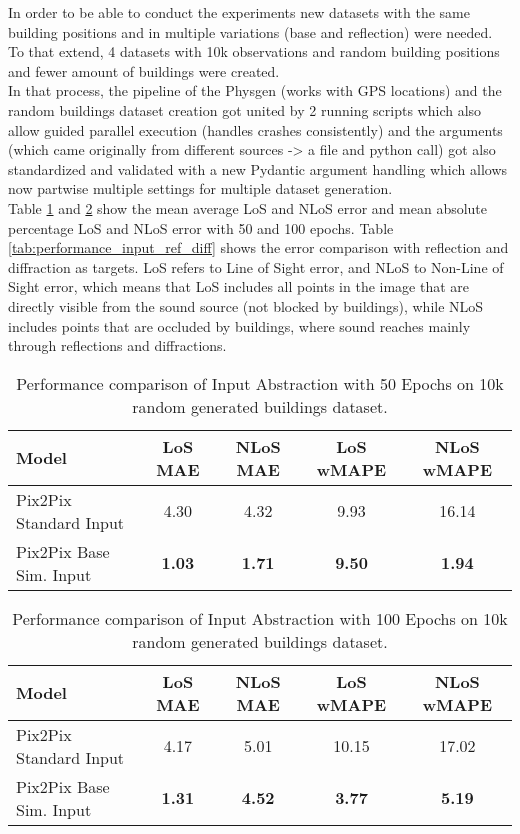 		In order to be able to conduct the experiments new datasets with the same building positions and in multiple variations (base and reflection) were needed. \\
		To that extend, 4 datasets with 10k observations and random building positions and fewer amount of buildings were created.\\
		In that process, the pipeline of the Physgen (works with GPS locations) and the random buildings dataset creation got united by 2 running scripts which also allow guided parallel execution (handles crashes consistently) and the arguments (which came originally from different sources -> a file and python call) got also standardized and validated with a new Pydantic \cite{pydantic} argument handling which allows now partwise multiple settings for multiple dataset generation.\\
		Table \ref{tab:performance_input_50} and \ref{tab:performance_input_100} show the mean average LoS and NLoS error and mean absolute percentage LoS and NLoS error with 50 and 100 epochs. Table \ref{tab:performance_input_ref_diff} shows the error comparison with reflection and diffraction as targets. LoS refers to Line of Sight error, and NLoS to Non-Line of Sight error, which means that LoS includes all points in the image that are directly visible from the sound source (not blocked by buildings), while NLoS includes points that are occluded by buildings, where sound reaches mainly through reflections and diffractions.
		
		\begin{table}[h!]
			\centering
			\begin{tabular}{|l|c|c|c|c|}
				\hline
				\textbf{Model} & \textbf{LoS MAE} & \textbf{NLoS MAE} & \textbf{LoS wMAPE} & \textbf{NLoS wMAPE} \\
				\hline
				Pix2Pix Standard Input & 4.30 & 4.32 & 9.93 & 16.14 \\
				Pix2Pix Base Sim. Input & \textbf{1.03} & \textbf{1.71} & \textbf{9.50} & \textbf{1.94} \\
				\hline
			\end{tabular}
			\caption{Performance comparison of Input Abstraction with 50 Epochs on 10k random generated buildings dataset.}
			\label{tab:performance_input_50}
		\end{table}
		
		\begin{table}[h!]
			\centering
			\begin{tabular}{|l|c|c|c|c|}
				\hline
				\textbf{Model} & \textbf{LoS MAE} & \textbf{NLoS MAE} & \textbf{LoS wMAPE} & \textbf{NLoS wMAPE} \\
				\hline
				Pix2Pix Standard Input & 4.17 & 5.01 & 10.15 & 17.02 \\
				Pix2Pix Base Sim. Input & \textbf{1.31} & \textbf{4.52} & \textbf{3.77} & \textbf{5.19} \\
				\hline
			\end{tabular}
			\caption{Performance comparison of Input Abstraction with 100 Epochs on 10k random generated buildings dataset.}
			\label{tab:performance_input_100}
		\end{table}
		
